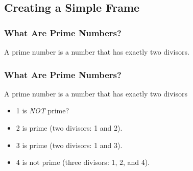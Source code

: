 \documentclass{beamer}
\begin{document}
\subsection{Creating a Simple Frame}
\begin{frame}
  \frametitle{What Are Prime Numbers?}
  A prime number is a number that has exactly two divisors.
\end{frame}
\begin{frame}
  \frametitle{What Are Prime Numbers?}
  \begin{definition}
    A \alert{prime number} is a number that has exactly two divisors
  \end{definition}
  \begin{example}
    \begin{itemize}
    \item 1 is \emph{NOT} prime?
      \pause
    \item 2 is prime (two divisors: 1 and 2).
    \item 3 is prime (two divisors: 1 and 3).
    \item 4 is not prime (\alert{three} divisors: 1, 2, and 4).
    \end{itemize}
  \end{example}
\end{frame}
\end{document}
